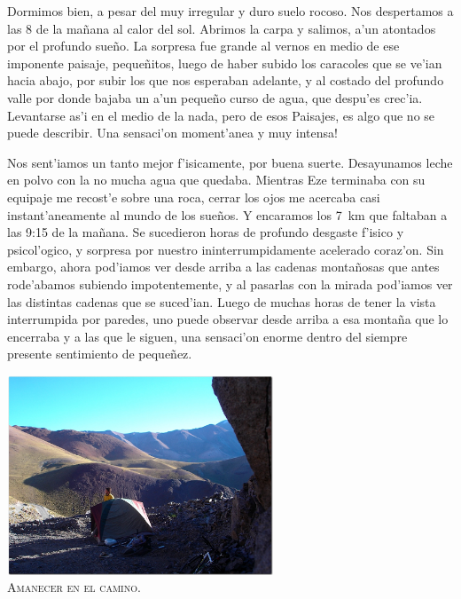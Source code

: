 Dormimos bien, a pesar del muy irregular y duro suelo rocoso. Nos despertamos a
las 8 de la ma\~nana al calor del sol. Abrimos la carpa y salimos, a'un
atontados por el profundo sue\~no. La sorpresa fue grande al vernos en medio
de ese imponente paisaje, peque\~nitos, luego de haber subido los caracoles que
se ve'ian hacia abajo, por subir los que nos esperaban adelante, y al costado
del profundo valle por donde bajaba un a'un peque\~no curso de agua, que
despu'es crec'ia. Levantarse as'i en el medio de la nada, pero de esos Paisajes,
es algo que no se puede describir. \textexclamdown Una sensaci'on moment'anea y
muy intensa!

Nos sent'iamos un tanto mejor f'isicamente, por buena suerte. Desayunamos leche
en polvo con la no mucha agua que quedaba. Mientras Eze terminaba con su
equipaje me recost'e sobre una roca, cerrar los ojos me acercaba casi
instant'aneamente al mundo de los sue\~nos. Y encaramos los 7~km que faltaban a
las 9:15 de la ma\~nana. Se sucedieron horas de profundo desgaste f'isico y
psicol'ogico, y sorpresa por nuestro ininterrumpidamente acelerado coraz'on. Sin
embargo, ahora pod'iamos ver desde arriba a las cadenas monta\~nosas que antes
rode'abamos subiendo impotentemente, y al pasarlas con la mirada pod'iamos ver
las distintas cadenas que se suced'ian. Luego de muchas horas de tener la vista
interrumpida por paredes, uno puede observar desde arriba a esa monta\~na que lo
encerraba y a las que le siguen, una sensaci'on enorme dentro del siempre
presente sentimiento de peque\~nez.

\begin{center} \includegraphics[width=300px]{images/DSC0375.JPG}
\textsc{\\Amanecer en el camino.} \end{center}

